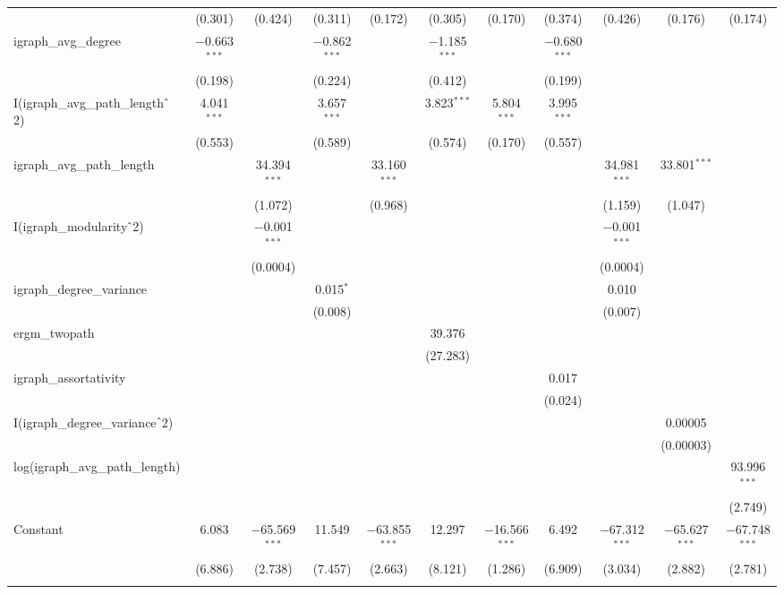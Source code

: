 \begin{table}[!htbp]
\begin{tabular}{@{\extracolsep{5pt}}lcccccccccc}
  & (0.301) & (0.424) & (0.311) & (0.172) & (0.305) & (0.170) & (0.374) & (0.426) & (0.176) & (0.174) \\ 
  igraph\_avg\_degree & $-$0.663$^{***}$ &  & $-$0.862$^{***}$ &  & $-$1.185$^{***}$ &  & $-$0.680$^{***}$ &  &  &  \\ 
  & (0.198) &  & (0.224) &  & (0.412) &  & (0.199) &  &  &  \\ 
  I(igraph\_avg\_path\_length$\hat{\mkern6mu}$2) & 4.041$^{***}$ &  & 3.657$^{***}$ &  & 3.823$^{***}$ & 5.804$^{***}$ & 3.995$^{***}$ &  &  &  \\ 
  & (0.553) &  & (0.589) &  & (0.574) & (0.170) & (0.557) &  &  &  \\ 
  igraph\_avg\_path\_length &  & 34.394$^{***}$ &  & 33.160$^{***}$ &  &  &  & 34.981$^{***}$ & 33.801$^{***}$ &  \\ 
  &  & (1.072) &  & (0.968) &  &  &  & (1.159) & (1.047) &  \\ 
  I(igraph\_modularity$\hat{\mkern6mu}$2) &  & $-$0.001$^{***}$ &  &  &  &  &  & $-$0.001$^{***}$ &  &  \\ 
  &  & (0.0004) &  &  &  &  &  & (0.0004) &  &  \\ 
  igraph\_degree\_variance &  &  & 0.015$^{*}$ &  &  &  &  & 0.010 &  &  \\ 
  &  &  & (0.008) &  &  &  &  & (0.007) &  &  \\ 
  ergm\_twopath &  &  &  &  & 39.376 &  &  &  &  &  \\ 
  &  &  &  &  & (27.283) &  &  &  &  &  \\ 
  igraph\_assortativity &  &  &  &  &  &  & 0.017 &  &  &  \\ 
  &  &  &  &  &  &  & (0.024) &  &  &  \\ 
  I(igraph\_degree\_variance$\hat{\mkern6mu}$2) &  &  &  &  &  &  &  &  & 0.00005 &  \\ 
  &  &  &  &  &  &  &  &  & (0.00003) &  \\ 
  log(igraph\_avg\_path\_length) &  &  &  &  &  &  &  &  &  & 93.996$^{***}$ \\ 
  &  &  &  &  &  &  &  &  &  & (2.749) \\ 
  Constant & 6.083 & $-$65.569$^{***}$ & 11.549 & $-$63.855$^{***}$ & 12.297 & $-$16.566$^{***}$ & 6.492 & $-$67.312$^{***}$ & $-$65.627$^{***}$ & $-$67.748$^{***}$ \\ 
  & (6.886) & (2.738) & (7.457) & (2.663) & (8.121) & (1.286) & (6.909) & (3.034) & (2.882) & (2.781) \\ 
 \hline \\[-1.8ex] 

\end{tabular}
\end{table}
